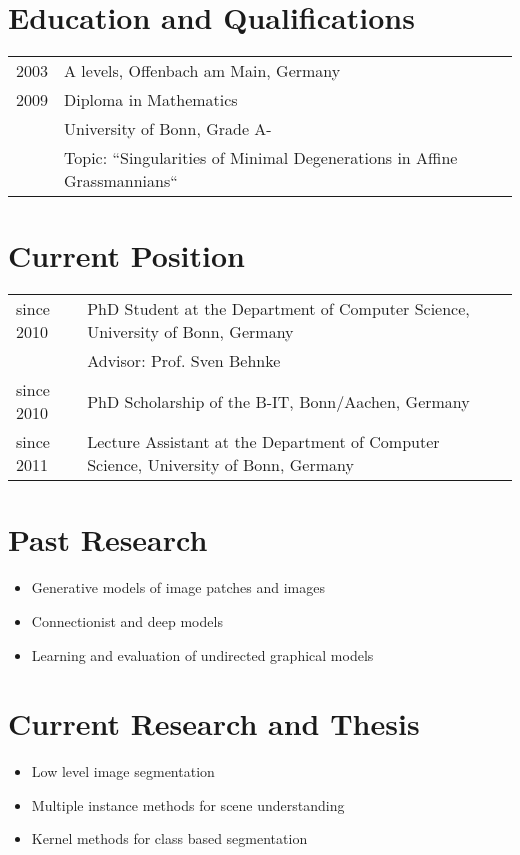 \documentclass[a4paper,11pt]{article}
\begin{document}
\maketitle

\section{Education and Qualifications}
\begin{tabular}{lll}
    2003 & A levels, Offenbach am Main, Germany\\
    2009 & Diploma in Mathematics \\ & University of Bonn, Grade A-\\
         & Topic: ``Singularities of Minimal Degenerations in Affine Grassmannians``
\end{tabular}

\section{Current Position}
\begin{tabular}{lll}
    since 2010 & PhD Student at the Department of Computer Science, University of Bonn, Germany\\
               & Advisor: Prof. Sven Behnke\\
    since 2010 & PhD Scholarship of the B-IT, Bonn/Aachen, Germany\\
    since 2011 & Lecture Assistant at the Department of Computer Science, University of Bonn, Germany
\end{tabular}

\section{Past Research}
\begin{itemize}
    \item Generative models of image patches and images
    \item Connectionist and deep models
    \item Learning and evaluation of undirected graphical models
\end{itemize}

\section{Current Research and Thesis}
\begin{itemize}
    \item Low level image segmentation
    \item Multiple instance methods for scene understanding
    \item Kernel methods for class based segmentation
\end{itemize}

\begin{publications}
\end{publications}
\end{document}
